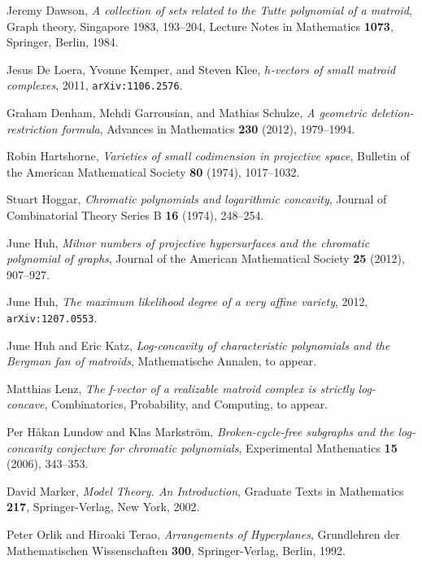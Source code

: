 \documentclass{compositio}
\theoremstyle{definition}
\theoremstyle{remark}
\begin{document}
\begin{thebibliography}{CDFV12}
 Jeremy Dawson,
			\emph{A collection of sets related to the Tutte polynomial of a matroid},
			Graph theory, Singapore 1983, 193--204, Lecture Notes in Mathematics {\bf 1073}, Springer, Berlin, 1984.

 Jesus De Loera, Yvonne Kemper, and Steven Klee,
			\emph{$h$-vectors of small matroid complexes},
			2011, \texttt{arXiv:1106.2576}.

 Graham Denham, Mehdi Garrousian, and Mathias Schulze,
			\emph{A geometric deletion-restriction formula}, 
			Advances in Mathematics {\bf 230} (2012), 1979--1994.
			



 Robin Hartshorne, 
			\emph{Varieties of small codimension in projective space}, 
			Bulletin of the American Mathematical Society {\bf 80} (1974), 1017--1032.


 Stuart Hoggar,
			\emph{Chromatic polynomials and logarithmic concavity},
			Journal of Combinatorial Theory Series B {\bf 16} (1974), 248--254.

 June Huh,
			\emph{Milnor numbers of projective hypersurfaces and the chromatic polynomial of graphs},
			Journal of the American Mathematical Society {\bf 25} (2012), 907--927.

 June Huh,
			\emph{The maximum likelihood degree of a very affine variety},
			2012, \texttt{arXiv:1207.0553}.

 June Huh and Eric Katz,
			\emph{Log-concavity of characteristic polynomials and the Bergman fan of matroids},
			Mathematische Annalen, to appear.

 Matthias Lenz,
			\emph{The f-vector of a realizable matroid complex is strictly log-concave},
			Combinatorics, Probability, and Computing, to appear.

 Per H\aa kan Lundow and Klas Markstr\"om,
			\emph{Broken-cycle-free subgraphs and the log-concavity conjecture for chromatic polynomials},
			Experimental Mathematics {\bf 15} (2006), 343--353.

 David Marker,
			\emph{Model Theory. An Introduction},
			Graduate Texts in Mathematics {\bf 217},
			Springer-Verlag, New York, 2002.
			

 Peter Orlik and Hiroaki Terao, 
			\emph{Arrangements of Hyperplanes}, 
			Grundlehren der Mathematischen Wissenschaften {\bf 300}, Springer-Verlag, Berlin, 1992.


\end{thebibliography}
\end{document}
